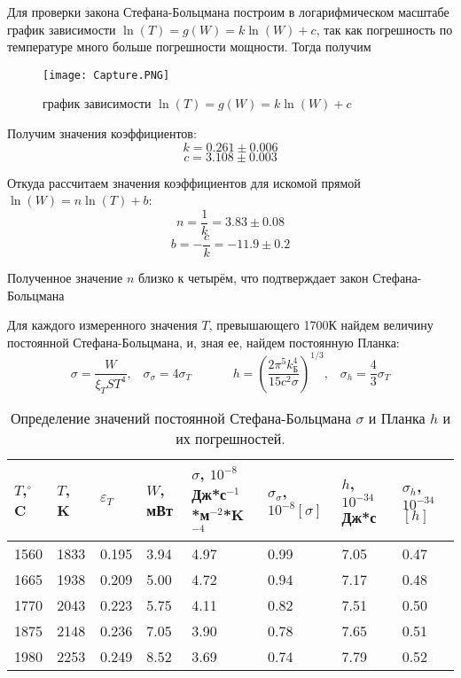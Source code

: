 \documentclass[a4paper]{article}
\begin{document}
Для проверки закона Стефана-Больцмана построим в логарифмическом масштабе график зависимости $\ln(T)=g(W)=k\ln(W) + c$, так как погрешность по температуре много больше погрешности мощности. Тогда получим 

\begin{figure}[h]
    \centering
    \texttt{[image: Capture.PNG]}
    \caption{график зависимости $\ln(T)=g(W)=k\ln(W) + c$}
    \label{fig:vac}
\end{figure}

Получим значения коэффициентов:
$$k=0.261\pm0.006$$
$$c=3.108\pm0.003$$
\par Откуда рассчитаем значения коэффициентов для искомой прямой $\ln(W)=n\ln(T)+b$:
$$n=\frac{1}{k}=3.83\pm0.08$$
$$b=-\frac{c}{k}=-11.9\pm0.2$$
\par Полученное значение $n$ близко к четырём, что подтверждает закон Стефана-Больцмана

Для каждого измеренного значения $T$, превышающего 1700К найдем величину постоянной Стефана-Больцмана, и, зная ее, найдем постоянную Планка:
\[
\sigma = \frac{W}{\xi_T S T^4}, \hspace{10pt} \sigma_\sigma = 4\sigma_T \hspace{40pt} h = (\frac{2 \pi^5 k^4_\text{Б}}{15c^2 \sigma})^{1/3}, \hspace{10pt} \sigma_h = \frac{4}{3} \sigma_T
\]

    \begin{table}[h]
    \centering
    \begin{center}
    \caption{Определение значений постоянной Стефана-Больцмана $\sigma$ и Планка $h$ и их погрешностей.}
    \end{center}
\begin{tabular}{|l|l|l|l|l|l|l|l|}
\hline
$T$,$^{\circ}$C & $T$, K & $\varepsilon_T$ & $W$, мВт    & $\sigma$, $10^{-8}$ Дж*с$^{-1}$*м$^{-2}$*K$^{-4}$ & $\sigma_\sigma$, $10^{-8}[\sigma]$ & $h$, $10^{-34}$ Дж*с    & $\sigma_h$, $10^{-34}$ $[h]$  \\ \hline
1560 & 1833 & 0.195   & 3.94 & 4.97  & 0.99         & 7.05 & 0.47     \\ \hline
1665 & 1938 & 0.209   & 5.00 & 4.72  & 0.94         & 7.17 & 0.48     \\ \hline
1770 & 2043 & 0.223   & 5.75 & 4.11  & 0.82         & 7.51 & 0.50     \\ \hline
1875 & 2148 & 0.236   & 7.05 & 3.90  & 0.78         & 7.65 & 0.51     \\ \hline
1980 & 2253 & 0.249   & 8.52 & 3.69  & 0.74         & 7.79 & 0.52     \\ \hline
\end{tabular}
\end{table}   
\end{document}
